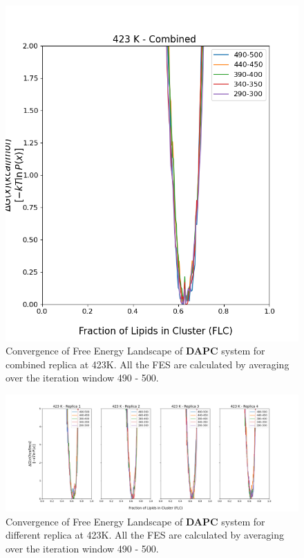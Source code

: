 \documentclass{biophys-new}
\begin{document}
\begin{figure}[hbt!]
\centering
\includegraphics[width=0.6\linewidth]{all_plots/ClusterLipids2Total/DPPC_DAPC_CHOL/423K/Convergence_DAPC_MULTI__423_ClusterLipids2Total.png}
\caption{Convergence of Free Energy Landscape of \textbf{DAPC} system for combined replica at 423K. All the FES are calculated by averaging over the iteration window 490 - 500.}
\label{fig:view}

\end{figure}

\begin{figure}[hbt!]
\centering
\includegraphics[width=1.1\linewidth]{all_plots/ClusterLipids2Total/DPPC_DAPC_CHOL/423K/Convergence_DAPC_423_ClusterLipids2Total.png}
\caption{Convergence of Free Energy Landscape of \textbf{DAPC} system for different replica at 423K. All the FES are calculated by averaging over the iteration window 490 - 500.}
\label{fig:view}

\end{figure}
\end{document}
